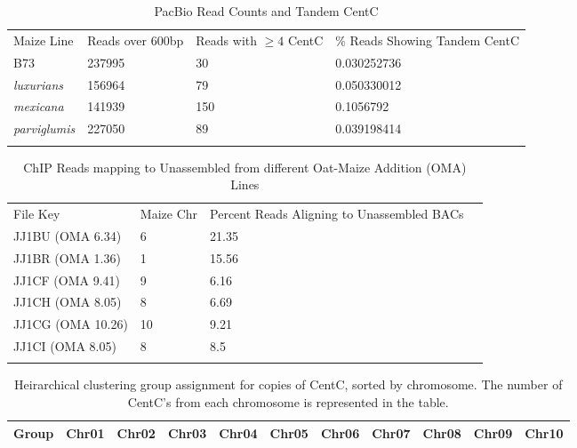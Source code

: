 {%
\begin{table}[h!]
\caption{PacBio Read Counts and Tandem CentC}
\label{supp.pacbio}       %
\begin{tabular}{llll}
\hline\noalign{\smallskip}
Maize Line & Reads over 600bp & Reads with $\geq 4$ CentC & \% Reads Showing Tandem CentC \\
\noalign{\smallskip}\hline\noalign{\smallskip}				
B73	& 237995	& 30	& 0.030252736	\\
\emph{luxurians}		&156964	&	79	&	0.050330012	\\
\emph{mexicana}	 	&141939 	&	150	&	0.1056792	\\
\emph{parviglumis}	&227050	& 89		&	0.039198414	\\
\noalign{\smallskip}\hline
\end{tabular}
\end{table}

\begin{table}[h!]
\caption{ChIP Reads mapping to Unassembled from different Oat-Maize Addition (OMA) Lines}
\label{supp.gaby}       %
\begin{tabular}{llll}
\hline\noalign{\smallskip}
File Key & Maize Chr & Percent Reads Aligning to Unassembled BACs\\
\noalign{\smallskip}\hline\noalign{\smallskip}				
JJ1BU (OMA 6.34) & 6 & 21.35\\
JJ1BR (OMA 1.36) & 1 & 15.56\\
JJ1CF (OMA 9.41) & 9 & 6.16\\
JJ1CH (OMA 8.05) & 8 & 6.69\\
JJ1CG (OMA 10.26) & 10 & 9.21\\
JJ1CI (OMA 8.05) & 8 & 8.5\\
\noalign{\smallskip}\hline
\end{tabular}
\end{table}


\pagebreak
 \begin{longtable}[c]{|c|c|c|c|c|c|c|c|c|c|c|}
 \caption{Heirarchical clustering group assignment for copies of CentC, sorted by chromosome.  The number of CentC's from each chromosome is represented in the table.\label{long}}\\ 
\hline

\hline
Group & Chr01 & Chr02 & Chr03 & Chr04 & Chr05 & Chr06 & Chr07 & Chr08 & Chr09 & Chr10\\
 \hline
 \endfirsthead


\end{longtable}}
